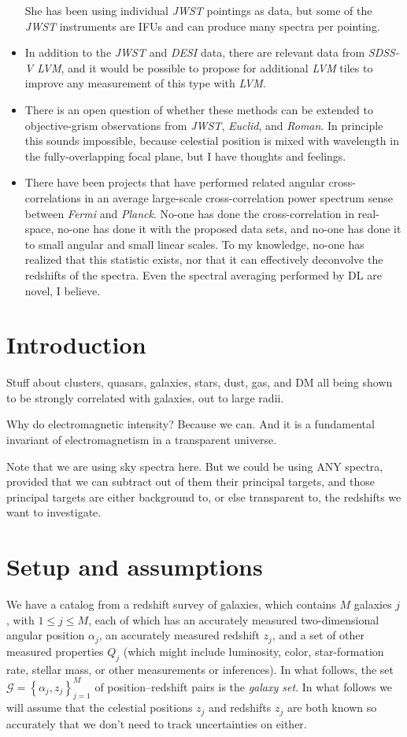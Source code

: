 \documentclass{article}
\newcommand{\project}[1]{\textsl{#1}}
\newcommand{\setof}[1]{\left\{{#1}\right\}}
\newcommand{\set}[1]{\mathscr{#1}}
\begin{document}
\begin{itemize}
  She has been using individual \project{JWST} pointings as data, but some of the \project{JWST} instruments are IFUs and can produce many spectra per pointing.
\item In addition to the \project{JWST} and \project{DESI} data, there are relevant data from \project{SDSS-V LVM}, and it would be possible to propose for additional \project{LVM} tiles to improve any measurement of this type with \project{LVM}.
\item There is an open question of whether these methods can be extended to objective-grism observations from \project{JWST}, \project{Euclid}, and \project{Roman}.
  In principle this sounds impossible, because celestial position is mixed with wavelength in the fully-overlapping focal plane, but I have thoughts and feelings.
\item There have been projects that have performed related angular cross-correlations in an average large-scale cross-correlation power spectrum sense between \project{Fermi} and \project{Planck}.
  No-one has done the cross-correlation in real-space, no-one has done it with the proposed data sets, and no-one has done it to small angular and small linear scales.
  To my knowledge, no-one has realized that this statistic exists, nor that it can effectively deconvolve the redshifts of the spectra.
  Even the spectral averaging performed by DL are novel, I believe.
\end{itemize}


\section{Introduction}\label{sec:intro}
Stuff about clusters, quasars, galaxies, stars, dust, gas, and DM all being shown to be strongly correlated with galaxies, out to large radii.

Why do electromagnetic intensity? Because we can. And it is a fundamental invariant of electromagnetism in a transparent universe.

Note that we are using sky spectra here. But we could be using ANY spectra, provided that we can subtract out of them their principal targets, and those principal targets are either background to, or else transparent to, the redshifts we want to investigate.

\section{Setup and assumptions}\label{sec:setup}
We have a catalog from a redshift survey of galaxies, which contains $M$ galaxies $j$, with $1\leq j\leq M$, each of which has an accurately measured two-dimensional angular position $\alpha_j$, an accurately measured redshift $z_j$, and a set of other measured properties $Q_j$ (which might include luminosity, color, star-formation rate, stellar mass, or other measurements or inferences).
In what follows, the set $\set{G}=\setof{\alpha_j, z_j}_{j=1}^M$ of position--redshift pairs is the \emph{galaxy set}.
In what follows we will assume that the celestial positions $z_j$ and redshifts $z_j$ are both known so accurately that we don't need to track uncertainties on either.
\end{document}
